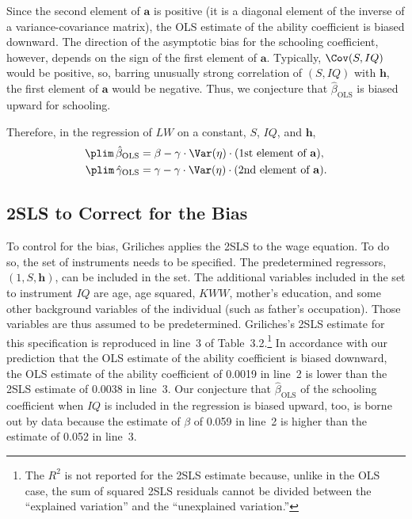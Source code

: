 Since the second element of $\mathbf{a}$ is positive (it is a diagonal element of the inverse of
a variance-covariance matrix), the OLS estimate of the ability coefficient is biased
downward.  The direction of the asymptotic bias for the schooling coefficient, however,
depends on the sign of the first element of $\mathbf{a}$.  Typically, $\Cov(S, IQ)$ would
be positive, so, barring unusually strong correlation of $(S, IQ)$ with $\mathbf{h}$, the first
element of $\mathbf{a}$ would be negative.  Thus, we conjecture that $\hat{\beta}_{\text{OLS}}$ is
biased upward for schooling.

Therefore, in the regression of $LW$ on a constant, $S$, $IQ$, and $\mathbf{h}$,
\begin{align}
  \plim\, \hat{\beta}_{\text{OLS}}
  &= \beta - \gamma \cdot \Var(\eta) \cdot \text{(1st element of $\mathbf{a}$)},
  \label{eq:3.9.7a} \\
  \plim\, \hat{\gamma}_{\text{OLS}}
  &= \gamma - \gamma \cdot \Var(\eta) \cdot \text{(2nd element of $\mathbf{a}$)}.
  \label{eq:3.9.7b}
\end{align}

\subsection*{2SLS to Correct for the Bias}

To control for the bias, Griliches applies the 2SLS to the wage equation.  To do
so, the set of instruments needs to be specified.  The predetermined regressors,
$(1, S, \mathbf{h})$, can be included in the set.  The additional variables included in the set
to instrument $IQ$ are age, age squared, $KWW$, mother's education, and some other
background variables of the individual (such as father's occupation).  Those variables
are thus assumed to be predetermined.  Griliches's 2SLS estimate for this
specification is reproduced in line~3 of Table~3.2.\footnote{The $R^2$ is not reported for
the 2SLS estimate because, unlike in the OLS case, the sum of squared 2SLS
residuals cannot be divided between the ``explained variation'' and the ``unexplained
variation.''}  In accordance with our prediction that the OLS estimate of the ability
coefficient is biased downward, the OLS estimate of the ability coefficient of
0.0019 in line~2 is lower than the 2SLS estimate of 0.0038 in line~3.  Our conjecture
that $\hat{\beta}_{\text{OLS}}$ of the schooling coefficient when $IQ$ is included in the
regression is biased upward, too, is borne out by data because the estimate of
$\beta$ of 0.059 in line~2 is higher than the estimate of 0.052 in line~3.

